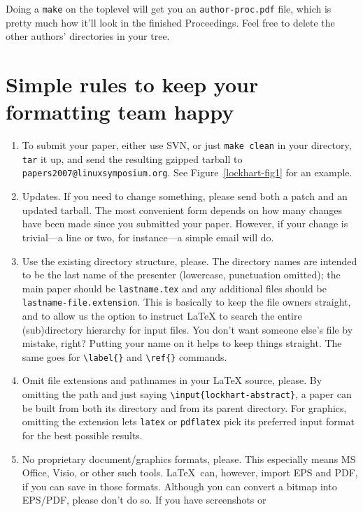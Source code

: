 \documentclass[final]{ols}
\providecommand{\XFuname}{papers2007}
\providecommand{\XFaddr}{linuxsymposium}
\begin{document}
Doing a \texttt{make} on the toplevel will get you an
\texttt{author-proc.pdf} file, which is pretty much how it'll look in
the finished Proceedings.  Feel free to delete the other authors'
directories in your tree.


\section{Simple rules to keep your formatting team happy}
\label{lockhart-subrules}
\begin{enumerate}
\item To submit your paper, either use SVN, or just \texttt{make clean} in your
  directory, \texttt{tar} it up, and send the resulting gzipped tarball to
  \texttt{{\XFuname}{@}{\XFaddr}.org}.
  See Figure~\ref{lockhart-fig1} for an example.
\item Updates.  If you need to change something, please send both
  a patch and an updated tarball.  The most convenient form depends on
  how many changes have been made since you submitted your paper.
  However, if your change is trivial---a line or two, for instance---a
  simple email will do.  
\item Use the existing directory structure, please.  The directory
  names are intended to be the last name of the presenter (lowercase,
  punctuation omitted); the main paper should be
  \texttt{lastname.tex} and any additional files should be
  \texttt{lastname-file.extension}.   This is basically to keep
  the file owners straight, and to allow us the option to
  instruct {\LaTeX} to search the entire (sub)directory hierarchy for
  input files.  You don't want someone else's file by mistake, right?
  Putting your name on it helps to keep things straight.  The same
  goes for \verb|\label{}| and \verb|\ref{}| commands.
\item Omit file extensions and pathnames in your {\LaTeX} source,
  please.  By omitting the path and just saying
  \texttt{{\textbackslash}input\{lockhart-abstract\}}, 
  a paper can be built from both its directory and from its
  parent directory.  For graphics, omitting the extension lets
  \texttt{latex} or 
  \texttt{pdflatex} pick its preferred input format for the best
  possible results.
\item No proprietary document/graphics formats, please.  This
  especially means MS 
  Office, Visio, or other such tools.  \LaTeX\ can, however, import
  EPS and PDF, if you can save in those formats.  Although you can convert
  a bitmap into EPS/PDF, please don't do so.  If you have screenshots or

\end{enumerate}
\end{document}
